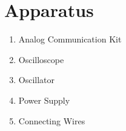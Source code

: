 \section*{Apparatus}

\begin{enumerate}
    \item Analog Communication Kit
    \item Oscilloscope
    \item Oscillator
    \item Power Supply
    \item Connecting Wires
\end{enumerate}